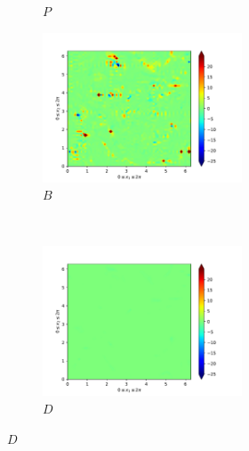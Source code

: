 \begin{figure}[H]
\begin{subfigure}{0.45\textwidth}
        \caption{$P$}
    \end{subfigure}
    \newline
    \begin{subfigure}{0.45\textwidth}
        \includegraphics[height=1.75in]{media/run-cds-65/B-ke-1310}
        \caption{$B$}
    \end{subfigure}
    ~
    \begin{subfigure}{0.45\textwidth}
        \includegraphics[height=1.75in]{media/run-cds-65/D-ke-1310}
        \caption{$D$}
    \end{subfigure}
\end{figure}

\newpage
